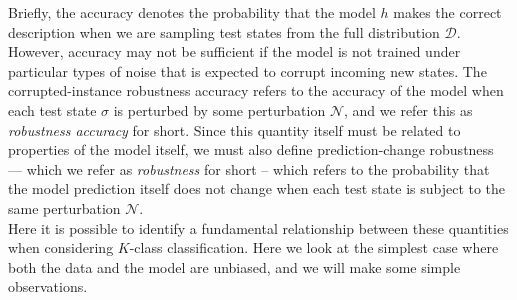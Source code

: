 \documentclass[onecolumn,prx, superscriptaddress,longbibliography,margin=1mm 11pt]{revtex4-2}
\begin{document}
Briefly, the accuracy denotes the probability that the model $h$ makes the correct description when we are sampling test states from the full distribution $\mathcal{D}$. However, accuracy may not be sufficient if the model is not trained under particular types of noise that is expected to corrupt incoming new states. The corrupted-instance robustness accuracy refers to the accuracy of the model when each test state $\sigma$ is perturbed by some perturbation $\mathcal{N}$, and we refer this as \textit{robustness accuracy} for short. Since this quantity itself must be related to properties of the model itself, we must also define prediction-change robustness --- which we refer as \textit{robustness} for short -- which refers to the probability that the model prediction itself does not change when each test state is subject to the same perturbation $\mathcal{N}$. \\

Here it is possible to identify a fundamental relationship between these quantities when considering $K$-class classification. Here we look at the simplest case where both the data and the model are unbiased, and we will make some simple observations. 
\end{document}
